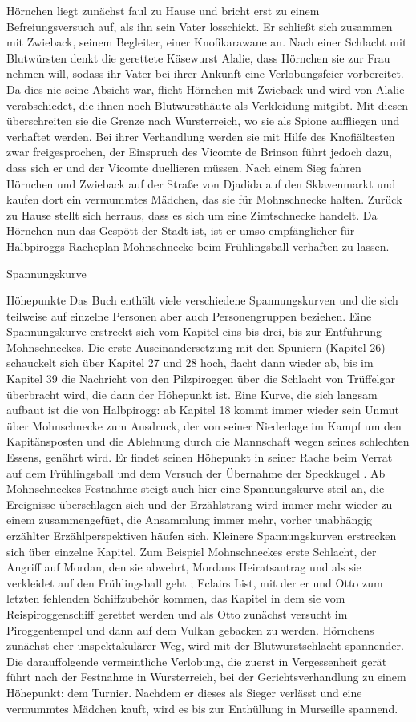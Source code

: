Hörnchen liegt zunächst faul zu Hause und bricht erst zu einem Befreiungsversuch auf, als ihn sein Vater losschickt. Er schließt sich zusammen mit Zwieback, seinem Begleiter, einer Knofikarawane an. Nach einer Schlacht mit Blutwürsten denkt die gerettete Käsewurst Alalie, dass Hörnchen sie zur Frau nehmen will, sodass ihr Vater bei ihrer Ankunft eine Verlobungsfeier vorbereitet. Da dies nie seine Absicht war, flieht Hörnchen mit Zwieback und wird von Alalie verabschiedet, die ihnen noch Blutwursthäute als Verkleidung mitgibt. Mit diesen überschreiten sie die Grenze nach Wursterreich, wo sie als Spione auffliegen und verhaftet werden. Bei ihrer Verhandlung werden sie mit Hilfe des Knofiältesten zwar freigesprochen, der Einspruch des Vicomte de Brinson führt jedoch dazu, dass sich er und der Vicomte duellieren müssen. Nach einem Sieg fahren Hörnchen und Zwieback auf der Straße von Djadida auf den Sklavenmarkt und kaufen dort ein vermummtes Mädchen, das sie für Mohnschnecke halten. Zurück zu Hause stellt sich herraus, dass es sich um eine Zimtschnecke handelt. Da Hörnchen nun das Gespött der Stadt ist, ist er umso empfänglicher für Halbpiroggs Racheplan Mohnschnecke beim Frühlingsball verhaften zu lassen.


Spannungskurve


Höhepunkte
Das Buch enthält viele verschiedene Spannungskurven und die sich teilweise auf einzelne Personen aber auch Personengruppen beziehen.  Eine Spannungskurve erstreckt sich vom Kapitel eins bis drei, bis zur Entführung Mohnschneckes. Die erste Auseinandersetzung mit den Spuniern (Kapitel 26) schauckelt sich über Kapitel 27 und 28 hoch, flacht dann wieder ab, bis im Kapitel 39 die Nachricht von den Pilzpiroggen über die Schlacht von Trüffelgar überbracht wird, die dann der Höhepunkt ist. Eine Kurve, die sich langsam aufbaut ist die von Halbpirogg: ab Kapitel 18 kommt immer wieder sein Unmut über Mohnschnecke zum Ausdruck, der von seiner Niederlage im Kampf um den Kapitänsposten und die Ablehnung durch die Mannschaft wegen seines schlechten Essens,  genährt wird. Er findet seinen Höhepunkt in seiner Rache beim Verrat auf dem Frühlingsball und dem Versuch der Übernahme der Speckkugel . Ab Mohnschneckes Festnahme steigt auch hier eine Spannungskurve steil an, die Ereignisse überschlagen sich und der Erzählstrang wird immer mehr wieder zu einem zusammengefügt, die Ansammlung immer mehr, vorher unabhängig erzählter Erzählperspektiven häufen sich. Kleinere Spannungskurven erstrecken sich über einzelne Kapitel. Zum Beispiel Mohnschneckes erste Schlacht, der Angriff auf Mordan, den sie abwehrt, Mordans Heiratsantrag und als sie verkleidet auf den Frühlingsball geht ; Eclairs List, mit der er und Otto zum letzten fehlenden Schiffzubehör kommen, das Kapitel in dem sie vom Reispiroggenschiff gerettet werden und als Otto zunächst versucht im Piroggentempel und dann auf dem Vulkan gebacken zu werden. Hörnchens zunächst eher unspektakulärer Weg, wird mit der Blutwurstschlacht spannender. Die darauffolgende vermeintliche Verlobung, die zuerst in Vergessenheit gerät führt nach der Festnahme in Wursterreich, bei der Gerichtsverhandlung zu einem Höhepunkt: dem Turnier. Nachdem er dieses als Sieger verlässt und eine vermummtes Mädchen kauft, wird es bis zur Enthüllung in Murseille spannend.



